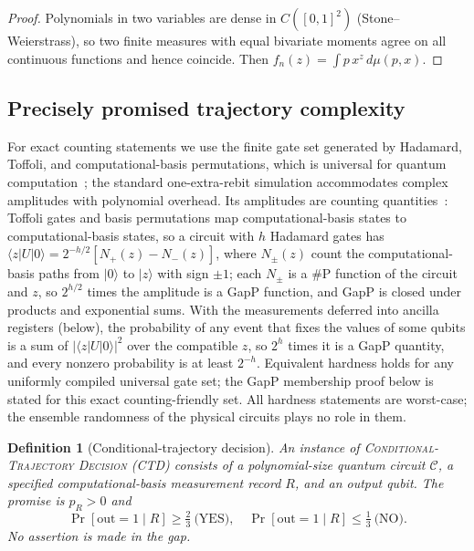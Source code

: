 \documentclass[aps,prx,reprint,superscriptaddress,nobibnotes,longbibliography]{revtex4-2}
\newtheorem{definition}{Definition}
\theoremstyle{remark}
\begin{document}
\begin{proof}
Polynomials in two variables are dense in $C([0,1]^2)$ (Stone--Weierstrass), so two finite measures with equal bivariate moments agree on all continuous functions and hence coincide.  Then $f_n(z)=\int p\,x^z\,d\mu(p,x)$.
\end{proof}

\subsection{Precisely promised trajectory complexity}

For exact counting statements we use the finite gate set generated by Hadamard, Toffoli, and computational-basis permutations, which is universal for quantum computation~\cite{Shi2003,Aharonov2003}; the standard one-extra-rebit simulation accommodates complex amplitudes with polynomial overhead.  Its amplitudes are counting quantities~\cite{Fenner1994}: Toffoli gates and basis permutations map computational-basis states to computational-basis states, so a circuit with $h$ Hadamard gates has $\langle z|U|0\rangle=2^{-h/2}[N_+(z)-N_-(z)]$, where $N_\pm(z)$ count the computational-basis paths from $|0\rangle$ to $|z\rangle$ with sign $\pm1$; each $N_\pm$ is a $\#$P function of the circuit and $z$, so $2^{h/2}$ times the amplitude is a GapP function, and GapP is closed under products and exponential sums.  With the measurements deferred into ancilla registers (below), the probability of any event that fixes the values of some qubits is a sum of $|\langle z|U|0\rangle|^2$ over the compatible $z$, so $2^h$ times it is a GapP quantity, and every nonzero probability is at least $2^{-h}$.  Equivalent hardness holds for any uniformly compiled universal gate set; the GapP membership proof below is stated for this exact counting-friendly set.  All hardness statements are worst-case; the ensemble randomness of the physical circuits plays no role in them.

\begin{definition}[Conditional-trajectory decision]
An instance of \textsc{Conditional-Trajectory Decision} (CTD) consists of a polynomial-size quantum circuit $\mathcal C$, a specified computational-basis measurement record $R$, and an output qubit.  The promise is $p_R>0$ and
\begin{equation}
 \Pr[\mathrm{out}=1\mid R]\ge\tfrac23\ \text{(YES)},\quad
 \Pr[\mathrm{out}=1\mid R]\le\tfrac13\ \text{(NO)}.
\end{equation}
No assertion is made in the gap.
\end{definition}
\end{document}
